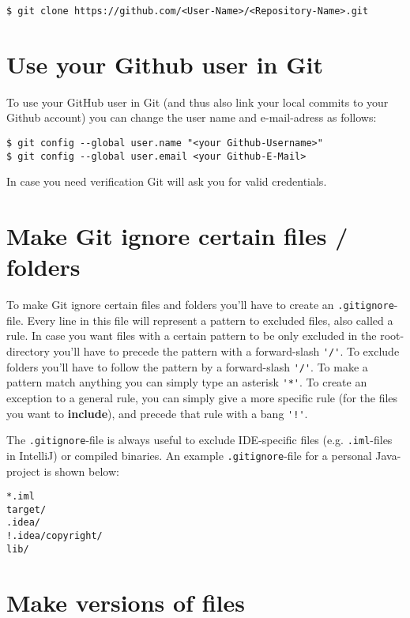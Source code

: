 \documentclass[a4paper, 12pt]{article}
\begin{document}
		\begin{lstlisting}
$ git clone https://github.com/<User-Name>/<Repository-Name>.git
		\end{lstlisting}
		
	\section{Use your Github user in Git}
	
		To use your GitHub user in Git (and thus also link your local commits to your Github account) you can change the user name and e-mail-adress as follows:
		
		\begin{lstlisting}
$ git config --global user.name "<your Github-Username>"
$ git config --global user.email <your Github-E-Mail>
		\end{lstlisting}
		
		In case you need verification Git will ask you for valid credentials.
		\newpage
				
	\section{Make Git ignore certain files / folders}
		
		To make Git ignore certain files and folders you'll have to create an \lstinline|.gitignore|-file. Every line in this file will represent a pattern to excluded files, also called a rule. In case you want files with a certain pattern to be only excluded in the root-directory you'll have to precede the pattern with a forward-slash \lstinline|'/'|. To exclude folders you'll have to follow the pattern by a forward-slash \lstinline|'/'|. To make a pattern match anything you can simply type an asterisk \lstinline|'*'|. To create an exception to a general rule, you can simply give a more specific rule (for the files you want to \textbf{include}), and precede that rule with a bang \lstinline|'!'|.
		
		The \lstinline|.gitignore|-file is always useful to exclude IDE-specific files (e.g. \lstinline|.iml|-files in IntelliJ) or compiled binaries. An example \lstinline|.gitignore|-file for a personal Java-project is shown below:
		
		\begin{lstlisting}
*.iml
target/
.idea/
!.idea/copyright/
lib/
		\end{lstlisting}

	\section{Make versions of files}
	
\end{document}
